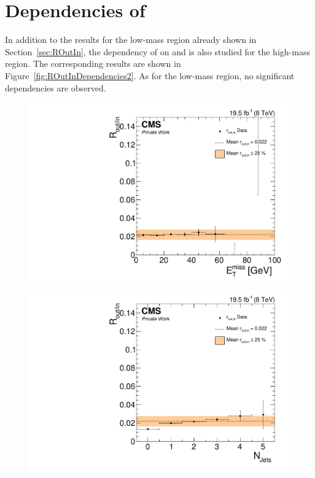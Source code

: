 \chapter{Dependencies of \Routin}
In addition to the results for the low-mass region already shown in Section~\ref{sec:ROutIn}, the dependency of \Routin on \MET and \njets is also studied for the high-mass region. The corresponding results are shown in Figure~\ref{fig:ROutInDependencies2}. As for the low-mass region, no significant dependencies are observed.
\label{app:routin}

\begin{figure}[htbp]
\centering
\begin{minipage}[t]{0.49\textwidth}
  \includegraphics[width=\textwidth]{plots/BG/rOutIn/rOutInSyst_DrellYanControlCentral_Full2012_MET_HighMass_SF_None.pdf}
\end{minipage}
\begin{minipage}[t]{0.49\textwidth}
\includegraphics[width=\textwidth]{plots/BG/rOutIn/rOutInSyst_DrellYanControlCentral_Full2012_NJets_HighMass_SF_None.pdf}

\end{minipage}
\end{figure}
